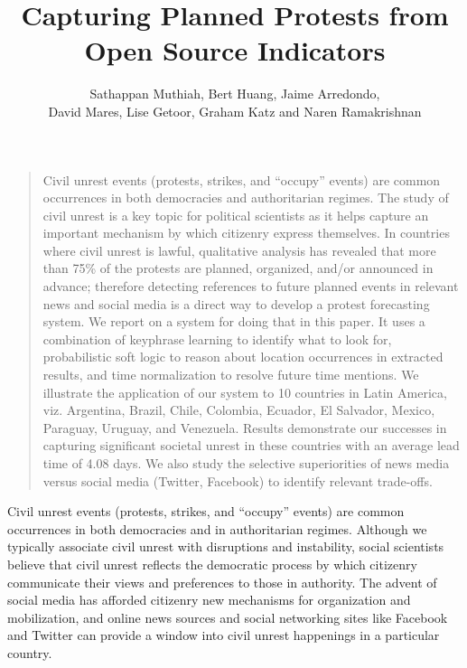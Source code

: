 \documentclass[letterpaper]{article}
\title{Capturing Planned Protests from Open Source Indicators}
\author{Sathappan Muthiah, Bert Huang, Jaime Arredondo, \\
David Mares, Lise Getoor, Graham Katz and Naren Ramakrishnan}
\begin{document}
\newcommand{\then}{\Rightarrow}
\newcommand{\softor}{\operatornamewithlimits{{\vee}}}
\newcommand{\softand}{\operatornamewithlimits{{\wedge}}}
\newcommand{\softthen}{\operatornamewithlimits{{\then}}}
\newcommand{\softneg}{\operatornamewithlimits{{\neg}}}

\newtheorem{exmp}{Example}
\maketitle
\onecolumn


\begin{quote} %
Civil unrest events (protests, strikes, and ``occupy'' events) are common
occurrences in both democracies and authoritarian regimes. The study of civil
unrest is a key topic for political scientists as it helps capture an important
mechanism by which citizenry express themselves. In countries where civil
unrest is lawful, qualitative analysis has revealed that more than 75\% of the
protests are planned, organized, and/or announced in advance; therefore
detecting references to future planned events in relevant news and social media
is a direct way to develop a protest forecasting system. We report on a system
for doing that in this paper. It uses a combination of keyphrase learning to
identify what to look for, probabilistic soft logic to reason about location
occurrences in extracted results, and time normalization to resolve future time
mentions. We illustrate the application of our system to 10 countries in Latin
America, viz. Argentina, Brazil, Chile, Colombia, Ecuador, El Salvador, Mexico,
Paraguay, Uruguay, and Venezuela. Results demonstrate our successes in
capturing significant societal unrest in these countries with an average lead
time of 4.08 days. We also study the selective superiorities of news media
versus social media (Twitter, Facebook) to identify relevant trade-offs.
\end{quote}


Civil unrest events (protests, strikes, and ``occupy'' events) are
common occurrences in both democracies and in authoritarian regimes.
Although we typically associate civil unrest with disruptions and
instability, social scientists believe that civil unrest reflects the
democratic process by which citizenry communicate their views and
preferences to those in authority.  The advent of social media has
afforded citizenry new mechanisms for organization and mobilization, and
online news sources and social networking sites like Facebook and
Twitter can provide a window into civil unrest happenings in a
particular country.
\end{document}
